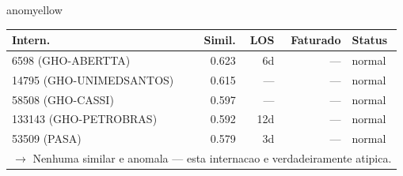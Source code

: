 \documentclass[a4paper,10pt]{article}
\begin{document}
\begin{anomalycard}[Internacao 166280 | GHO-PETROBRAS | MODERADO (z=2.05)]{anomyellow}
\begin{tabular}{l r r r l}\toprule\textbf{Intern.} & \textbf{Simil.} & \textbf{LOS} & \textbf{Faturado} & \textbf{Status} \\\midrule
6598 (GHO-ABERTTA) & 0.623 & 6d & --- & \textcolor{jcubeblue}{normal} \\
14795 (GHO-UNIMEDSANTOS) & 0.615 & --- & --- & \textcolor{jcubeblue}{normal} \\
58508 (GHO-CASSI) & 0.597 & --- & --- & \textcolor{jcubeblue}{normal} \\
133143 (GHO-PETROBRAS) & 0.592 & 12d & --- & \textcolor{jcubeblue}{normal} \\
53509 (PASA) & 0.579 & 3d & --- & \textcolor{jcubeblue}{normal} \\
\multicolumn{5}{l}{\textcolor{jcubeblue}{\small $\rightarrow$ Nenhuma similar e anomala --- esta internacao e verdadeiramente atipica.}} \\
\bottomrule\end{tabular}


\end{anomalycard}

\newpage
\end{document}
